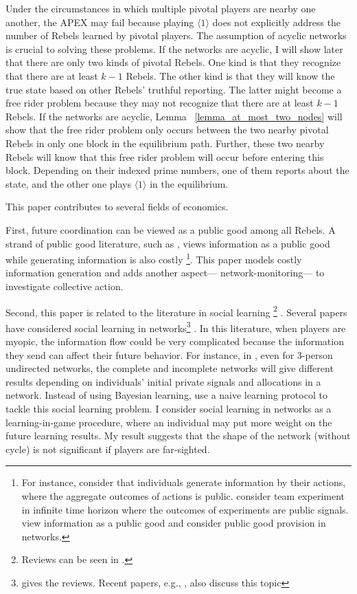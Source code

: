 \documentclass[12pt,letterpaper]{article}
\newtheorem*{main result}{Main Result}
\theoremstyle{definition}
\theoremstyle{remark}
\theoremstyle{claim}
\begin{document}
Under the circumstances in which multiple pivotal players are nearby one another, the APEX may fail because playing $\langle 1 \rangle$ does not explicitly address the number of Rebels learned by pivotal players. The assumption of acyclic networks is crucial to solving these problems. If the networks are acyclic, I will show later that there are only two kinds of pivotal Rebels. One kind is that they recognize that there are at least $k-1$ Rebels. The other kind is that they will know the true state based on other Rebels' truthful reporting. The latter might become a free rider problem because they may not recognize that there are at least $k-1$ Rebels.  If the networks are acyclic, Lemma ~\ref{lemma_at_most_two_nodes} will show that the free rider problem only occurs between the two nearby pivotal Rebels in only one block in the equilibrium path. Further, these two nearby Rebels will know that this free rider problem will occur before entering this block. Depending on their indexed prime numbers, one of them reports about the state, and the other one plays $\langle 1 \rangle$ in the equilibrium. 






This paper contributes to several fields of economics. 


First, future coordination can be viewed as a public good among all Rebels. A strand of public good literature, such as \citep{Lohmann1994}, views information as a public good while generating information is also costly \footnote{For instance, \citep{Lohmann1993}\citep{Lohmann1994} consider that individuals generate information by their actions, where the aggregate outcomes of actions is public. \citep{Bolto_Harris1999} consider team experiment in infinite time horizon where the outcomes of experiments are public signals. \citep{Bramoulle2007} view information as a public good and consider public good provision in networks.}. This paper models costly information generation and adds another aspect--- network-monitoring--- to investigate collective action.


Second, this paper is related to the literature in social learning \footnote{Reviews can be seen in \citep{Bikhchandani1998} \citep{Cao2001}.} . Several papers have considered social learning in networks\footnote{\citep{Goyal2012} gives the reviews. Recent papers, e.g., \citep{Acemoglu2011}\citep{Chatterjee2011}, also discuss this topic} . In this literature, when players are myopic, the information flow could be very complicated because the information they send can affect their future behavior. For instance, in \citep{RePEc:eee:gamebe:v:45:y:2003:i:2:p:329-346}, even for 3-person undirected networks, the complete and incomplete networks will give different results depending on individuals' initial private signals and allocations in a network. Instead of using Bayesian learning, \citep{Golub2010} use a naive learning protocol to tackle this social learning problem. I consider social learning in networks as a learning-in-game procedure, where an individual may put more weight on the future learning results. My result suggests that the shape of the network (without cycle) is not significant if players are far-sighted.
\end{document}
